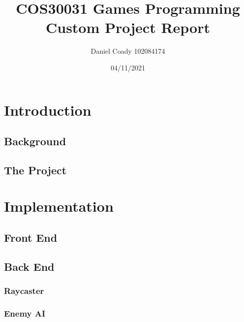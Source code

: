 \documentclass{article}
\title{COS30031 Games Programming\\Custom Project Report}
\author{Daniel Coady 102084174}
\date{04/11/2021}
\begin{document}
\maketitle

\pagebreak

\tableofcontents

\pagebreak

\section{Introduction}
\subsection{Background}

\subsection{The Project}

\section{Implementation}

\subsection{Front End}

\subsection{Back End}

\subsubsection{Raycaster}

\subsubsection{Enemy AI}
\end{document}
